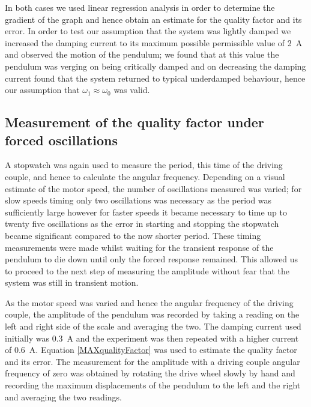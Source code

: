 \documentclass[12pt]{article}
\begin{document}
In both cases we used linear regression analysis in order to determine the gradient of the graph and hence obtain an estimate for the quality factor and its error. In order to test our assumption that the system was lightly damped we increased the damping current to its maximum possible permissible value of \SI{2}{\ampere} and observed the motion of the pendulum; we found that at this value the pendulum was verging on being critically damped and on decreasing the damping current found that the system returned to typical underdamped behaviour, hence our assumption that $\omega_1\approx\omega_0$ was valid.

\subsection{Measurement of the quality factor under forced oscillations}
A stopwatch was again used to measure the period, this time of the driving couple, and hence to calculate the angular frequency. Depending on a visual estimate of the motor speed, the number of oscillations measured was varied; for slow speeds timing only two oscillations was necessary as the period was sufficiently large however for faster speeds it became necessary to time up to twenty five oscillations as the error in starting and stopping the stopwatch became significant compared to the now shorter period. These timing measurements were made whilst waiting for the transient response of the pendulum to die down until only the forced response remained. This allowed us to proceed to the next step of measuring the amplitude without fear that the system was still in transient motion.

As the motor speed was varied and hence the angular frequency of the driving couple, the amplitude of the pendulum was recorded by taking a reading on the left and right side of the scale and averaging the two. The damping current used initially was \SI{0.3}{\ampere} and the experiment was then repeated with a higher current of \SI{0.6}{\ampere}. Equation \ref{MAXqualityFactor} was used to estimate the quality factor and its error. The measurement for the amplitude with a driving couple angular frequency of zero was obtained by rotating the drive wheel slowly by hand and recording the maximum displacements of the pendulum to the left and the right and averaging the two readings.
\end{document}
